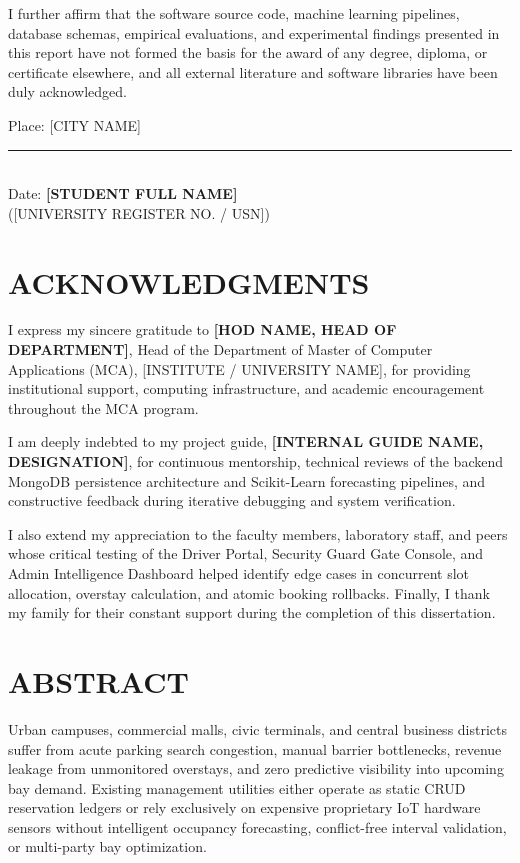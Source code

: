 \documentclass[12pt,a4paper,oneside]{report}
\newcommand{\studentname}{[STUDENT FULL NAME]}
\newcommand{\studentusn}{[UNIVERSITY REGISTER NO. / USN]}
\newcommand{\guidename}{[INTERNAL GUIDE NAME, DESIGNATION]}
\newcommand{\hodname}{[HOD NAME, HEAD OF DEPARTMENT]}
\newcommand{\collegename}{[INSTITUTE / UNIVERSITY NAME]}
\newcommand{\deptname}{Department of Master of Computer Applications (MCA)}
\begin{document}
I further affirm that the software source code, machine learning pipelines, database schemas, empirical evaluations, and experimental findings presented in this report have not formed the basis for the award of any degree, diploma, or certificate elsewhere, and all external literature and software libraries have been duly acknowledged.

\vspace{2.5cm}
\noindent
Place: [CITY NAME] \hfill \rule{5.5cm}{0.6pt} \\
Date: \underline{\hspace{3.5cm}} \hfill \textbf{\studentname} \\
\mbox{} \hfill (\studentusn)
\clearpage

\chapter*{ACKNOWLEDGMENTS}

I express my sincere gratitude to \textbf{\hodname}, Head of the \deptname, \collegename, for providing institutional support, computing infrastructure, and academic encouragement throughout the MCA program.

I am deeply indebted to my project guide, \textbf{\guidename}, for continuous mentorship, technical reviews of the backend MongoDB persistence architecture and Scikit-Learn forecasting pipelines, and constructive feedback during iterative debugging and system verification.

I also extend my appreciation to the faculty members, laboratory staff, and peers whose critical testing of the Driver Portal, Security Guard Gate Console, and Admin Intelligence Dashboard helped identify edge cases in concurrent slot allocation, overstay calculation, and atomic booking rollbacks. Finally, I thank my family for their constant support during the completion of this dissertation.
\clearpage

\chapter*{ABSTRACT}

Urban campuses, commercial malls, civic terminals, and central business districts suffer from acute parking search congestion, manual barrier bottlenecks, revenue leakage from unmonitored overstays, and zero predictive visibility into upcoming bay demand. Existing management utilities either operate as static CRUD reservation ledgers or rely exclusively on expensive proprietary IoT hardware sensors without intelligent occupancy forecasting, conflict-free interval validation, or multi-party bay optimization.
\end{document}
